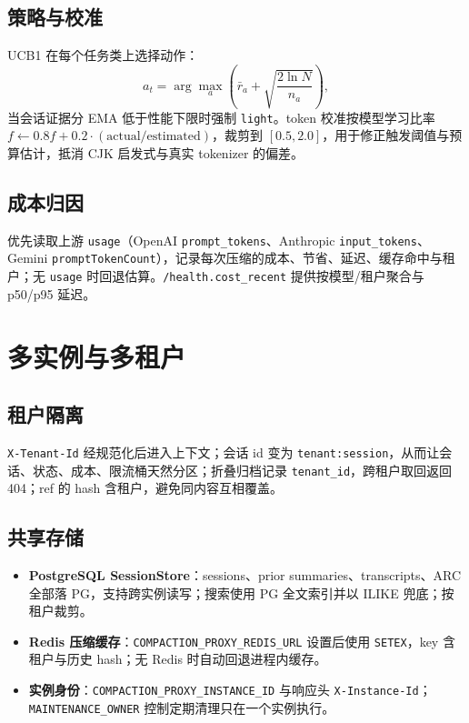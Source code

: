 \documentclass[11pt,a4paper]{ctexart}
\begin{document}
\subsection{策略与校准}
UCB1 在每个任务类上选择动作：
\begin{equation}
a_t = \arg\max_a \left( \bar r_a + \sqrt{\frac{2\ln N}{n_a}} \right),
\end{equation}
当会话证据分 EMA 低于性能下限时强制 \texttt{light}。token 校准按模型学习比率 $f \leftarrow 0.8f + 0.2\cdot(\text{actual}/\text{estimated})$，裁剪到 $[0.5,2.0]$，用于修正触发阈值与预算估计，抵消 CJK 启发式与真实 tokenizer 的偏差。

\subsection{成本归因}
优先读取上游 \texttt{usage}（OpenAI \texttt{prompt\_tokens}、Anthropic \texttt{input\_tokens}、Gemini \texttt{promptTokenCount}），记录每次压缩的成本、节省、延迟、缓存命中与租户；无 \texttt{usage} 时回退估算。\texttt{/health.cost\_recent} 提供按模型/租户聚合与 p50/p95 延迟。

\section{多实例与多租户}

\subsection{租户隔离}
\texttt{X-Tenant-Id} 经规范化后进入上下文；会话 id 变为 \texttt{tenant:session}，从而让会话、状态、成本、限流桶天然分区；折叠归档记录 \texttt{tenant\_id}，跨租户取回返回 404；ref 的 hash 含租户，避免同内容互相覆盖。

\subsection{共享存储}
\begin{itemize}
  \item \textbf{PostgreSQL SessionStore}：sessions、prior summaries、transcripts、ARC 全部落 PG，支持跨实例读写；搜索使用 PG 全文索引并以 ILIKE 兜底；按租户裁剪。
  \item \textbf{Redis 压缩缓存}：\texttt{COMPACTION\_PROXY\_REDIS\_URL} 设置后使用 \texttt{SETEX}，key 含租户与历史 hash；无 Redis 时自动回退进程内缓存。
  \item \textbf{实例身份}：\texttt{COMPACTION\_PROXY\_INSTANCE\_ID} 与响应头 \texttt{X-Instance-Id}；\texttt{MAINTENANCE\_OWNER} 控制定期清理只在一个实例执行。
\end{itemize}
\end{document}

